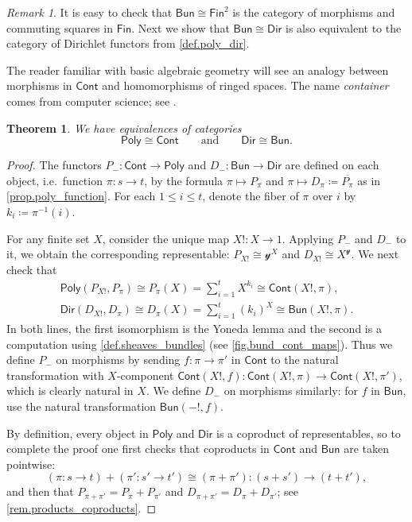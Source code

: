 \documentclass[11pt, article, one side]{memoir}
\theoremstyle{theorem}
\newtheorem{theorem}[equation]{Theorem}
\theoremstyle{definition}
\theoremstyle{remark}
\newtheorem{remark}[equation]{Remark}
\newcommand{\Cat}[1]{\mathsf{#1}}%
\newcommand{\inv}{^{-1}}
\newcommand{\finset}{\Cat{Fin}}
\newcommand{\cont}{\Cat{Cont}}
\newcommand{\bun}{\Cat{Bun}}
\newcommand{\yon}{\mathcal{y}}
\newcommand{\poly}{\Cat{Poly}}
\newcommand{\dir}{\Cat{Dir}}
\newcommand{\qqand}{\qquad\text{and}\qquad}
\begin{document}
\begin{remark}\label{rem.dir_fin2}
It is easy to check that $\bun\cong\finset^2$ is the category of morphisms and commuting squares in $\finset$. Next we show that $\bun\cong\dir$ is also equivalent to the category of Dirichlet functors from \cref{def.poly_dir}.

The reader familiar with basic algebraic geometry will see an analogy between morphisms in $\cont$ and homomorphisms of ringed spaces. The name \emph{container} comes from computer science; see \cite{**}.
\end{remark}

\begin{theorem}\label{thm.equivs}
We have equivalences of categories
\[
\poly\cong\cont
\qqand
\dir\cong\bun.
\]
\end{theorem}
\begin{proof}
The functors $P_-\colon\cont\to\poly$ and $D_-\colon\bun\to\dir$ are defined on each object, i.e.\ function $\pi\colon s\to t$, by the formula $\pi\mapsto P_\pi$ and $\pi\mapsto D_\pi\coloneqq\overline{P_\pi}$ as in \cref{prop.poly_function}. For each $1\leq i\leq t$, denote the fiber of $\pi$ over $i$ by $k_i\coloneqq\pi\inv(i)$.

For any finite set $X$, consider the unique map $X!\colon X\to 1$. Applying $P_-$ and $D_-$ to it, we obtain the corresponding representable: $P_{X!}\cong\yon^X$ and $D_{X!}\cong X^\yon$. We next check that
 \begin{gather*}
  \poly(P_{X!},P_\pi)\cong 
  P_\pi(X)=
  \sum_{i=1}^{t}X^{k_i}\cong
  \cont(X!, \pi),
  \\
  \dir(D_{X!}, D_\pi)\cong 
  D_\pi(X)=
  \sum_{i=1}^{t}(k_i)^X\cong
  \bun(X!, \pi).
\end{gather*}
In both lines, the first isomorphism is the Yoneda lemma and the second is a computation using \cref{def.sheaves_bundles} (see \cref{fig.bund_cont_maps}). Thus we define $P_-$ on morphisms by sending $f\colon\pi\to\pi'$ in $\cont$ to the natural transformation with $X$-component $\cont(X!,f)\colon\cont(X!,\pi)\to\cont(X!,\pi')$, which is clearly natural in $X$. We define $D_-$ on morphisms similarly: for $f$ in $\bun$, use the natural transformation $\bun(-!,f)$.

By definition, every object in $\poly$ and $\dir$ is a coproduct of representables, so to complete the proof one first checks that coproducts in $\cont$ and $\bun$ are taken pointwise:
\[
(\pi\colon s\to t)+(\pi'\colon s'\to t')\cong(\pi+\pi')\colon (s+s')\to (t+t'),
\]
and then that $P_{\pi+\pi'}=P_\pi+P_{\pi'}$ and $D_{\pi+\pi'}=D_\pi+D_{\pi'}$; see \cref{rem.products_coproducts}.
\end{proof}
\end{document}
